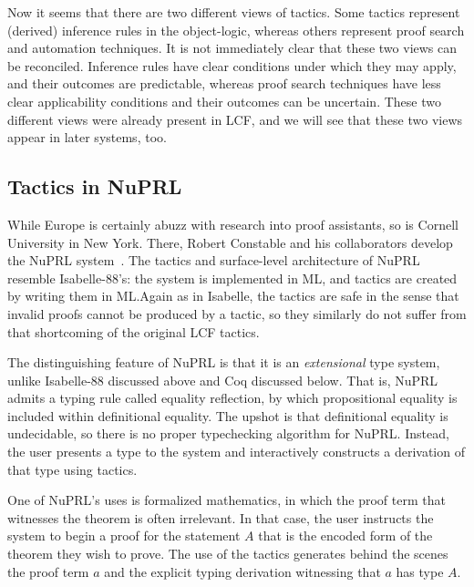 Now it seems that there are two different views of tactics.
Some tactics represent (derived) inference rules in the object-logic, whereas
others represent proof search and automation techniques.
It is not immediately clear that these two views can be reconciled.
Inference rules have clear conditions under which they may apply, and their
outcomes are predictable, whereas proof search techniques have less clear
applicability conditions and their outcomes can be uncertain.
These two different views were already present in LCF, and we will see that
these two views appear in later systems, too.

%

\subsection{Tactics in NuPRL}

While Europe is certainly abuzz with research into proof assistants, so is
Cornell University in New York. There, Robert Constable and his collaborators
develop the NuPRL system~\cite{nuprl}. The tactics and surface-level
architecture of NuPRL resemble Isabelle-88's: the system is implemented in ML,
and tactics are created by writing them in ML.\@ Again as in Isabelle, the
tactics are safe in the sense that invalid proofs cannot be produced by a
tactic, so they similarly do not suffer from that shortcoming of the original LCF tactics.

The distinguishing feature of NuPRL is that it is an \emph{extensional} type
system, unlike Isabelle-88 discussed above and Coq discussed below.
That is, NuPRL admits a typing rule called equality reflection, by which
propositional equality is included within definitional equality.
The upshot is that definitional equality is undecidable, so there is no proper
typechecking algorithm for NuPRL.\@
Instead, the user presents a type to the system and interactively constructs a
derivation of that type using tactics.

One of NuPRL's uses is formalized mathematics, in which the proof term
that witnesses the theorem is often irrelevant.
In that case, the user instructs the system to begin a proof for the statement
$A$ that is the encoded form of the theorem they wish to prove.
The use of the tactics generates behind the scenes the proof term $a$ and the
explicit typing derivation witnessing that $a$ has type $A$.

